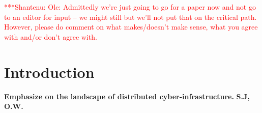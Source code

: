\documentclass[a4paper,10pt]{article}
\newcommand{\jhanote}[1]{  {\textcolor{red}     { ***Shantenu: #1 }}}
\newcommand{\jhanote}[1]{}
\begin{document}
\jhanote{Ole: Admittedly we're just going to go for a paper now and
  not go to an editor for input -- we might still but we'll not put
  that on the critical path. However, please do comment on what
  makes/doesn't make sense, what you agree with and/or don't agree
  with.}


\section{Introduction}

\textbf{Emphasize on the landscape of distributed
  cyber-infrastructure.} \textbf{S.J, O.W.}


 
\end{document}
